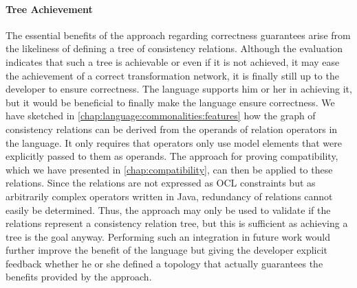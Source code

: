 \paragraph{Tree Achievement}
The essential benefits of the \commonalities approach regarding correctness guarantees arise from the likeliness of defining a tree of consistency relations.
Although the evaluation indicates that such a tree is achievable or even if it is not achieved, it may ease the achievement of a correct transformation network, it is finally still up to the developer to ensure correctness.
The language supports him or her in achieving it, but it would be beneficial to finally make the language ensure correctness.
We have sketched in \autoref{chap:language:commonalities:features} how the graph of consistency relations can be derived from the operands of relation operators in the \commonalities language.
It only requires that operators only use model elements that were explicitly passed to them as operands.
The approach for proving compatibility, which we have presented in \autoref{chap:compatibility}, can then be applied to these relations.
Since the relations are not expressed as \gls{OCL} constraints but as arbitrarily complex operators written in Java, redundancy of relations cannot easily be determined.
Thus, the approach may only be used to validate if the relations represent a consistency relation tree, but this is sufficient as achieving a tree is the goal anyway.
Performing such an integration in future work would further improve the benefit of the language but giving the developer explicit feedback whether he or she defined a topology that actually guarantees the benefits provided by the \commonalities approach.

